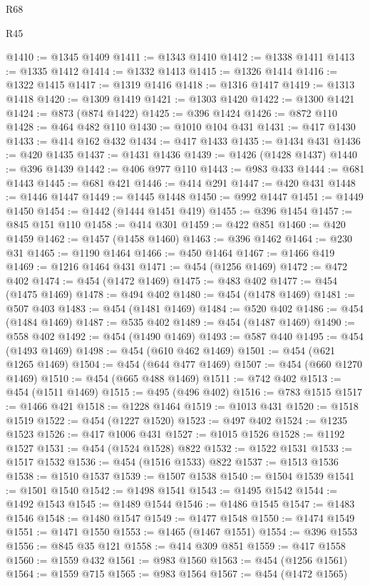 \begin{lexlean}{R68}
\begin{lexlean}{R45}
\begin{coremodule}
{{{{{{{{{{{{{{{{{{{{{{{{{{{{{{{{{{{{{{{{{{{{{{{{{{{{{{{{{{{{{{{{{{{{{{{{{{{{{{{{{{{{{{{{{{{@1410 := @1345 @1409
@1411 := @1343 @1410
@1412 := @1338 @1411
@1413 := @1335 @1412
@1414 := @1332 @1413
@1415 := @1326 @1414
@1416 := @1322 @1415
@1417 := @1319 @1416
@1418 := @1316 @1417
@1419 := @1313 @1418
@1420 := @1309 @1419
@1421 := @1303 @1420
@1422 := @1300 @1421
@1424 := @873 (@874 @1422)
@1425 := @396 @1424
@1426 := @872 @110
@1428 := @464 @482 @110
@1430 := @1010 @104 @431
@1431 := @417 @1430
@1433 := @414 @162 @432
@1434 := @417 @1433
@1435 := @1434 @431
@1436 := @420 @1435
@1437 := @1431 @1436
@1439 := @1426 (@1428 @1437)
@1440 := @396 @1439
@1442 := @406 @977 @110
@1443 := @983 @433
@1444 := @681 @1443
@1445 := @681 @421
@1446 := @414 @291
@1447 := @420 @431
@1448 := @1446 @1447
@1449 := @1445 @1448
@1450 := @992 @1447
@1451 := @1449 @1450
@1454 := @1442 (@1444 @1451 @419)
@1455 := @396 @1454
@1457 := @845 @151 @110
@1458 := @414 @301
@1459 := @422 @851
@1460 := @420 @1459
@1462 := @1457 (@1458 @1460)
@1463 := @396 @1462
@1464 := @230 @31
@1465 := @1190 @1464
@1466 := @450 @1464
@1467 := @1466 @419
@1469 := @1216 @1464 @431
@1471 := @454 (@1256 @1469)
@1472 := @472 @402
@1474 := @454 (@1472 @1469)
@1475 := @483 @402
@1477 := @454 (@1475 @1469)
@1478 := @494 @402
@1480 := @454 (@1478 @1469)
@1481 := @507 @403
@1483 := @454 (@1481 @1469)
@1484 := @520 @402
@1486 := @454 (@1484 @1469)
@1487 := @535 @402
@1489 := @454 (@1487 @1469)
@1490 := @558 @402
@1492 := @454 (@1490 @1469)
@1493 := @587 @440
@1495 := @454 (@1493 @1469)
@1498 := @454 (@610 @462 @1469)
@1501 := @454 (@621 @1265 @1469)
@1504 := @454 (@644 @477 @1469)
@1507 := @454 (@660 @1270 @1469)
@1510 := @454 (@665 @488 @1469)
@1511 := @742 @402
@1513 := @454 (@1511 @1469)
@1515 := @495 (@496 @402)
@1516 := @783 @1515
@1517 := @1466 @421
@1518 := @1228 @1464
@1519 := @1013 @431
@1520 := @1518 @1519
@1522 := @454 (@1227 @1520)
@1523 := @497 @402
@1524 := @1235 @1523
@1526 := @417 @1006 @431
@1527 := @1015 @1526
@1528 := @1192 @1527
@1531 := @454 (@1524 @1528) @822
@1532 := @1522 @1531
@1533 := @1517 @1532
@1536 := @454 (@1516 @1533) @822
@1537 := @1513 @1536
@1538 := @1510 @1537
@1539 := @1507 @1538
@1540 := @1504 @1539
@1541 := @1501 @1540
@1542 := @1498 @1541
@1543 := @1495 @1542
@1544 := @1492 @1543
@1545 := @1489 @1544
@1546 := @1486 @1545
@1547 := @1483 @1546
@1548 := @1480 @1547
@1549 := @1477 @1548
@1550 := @1474 @1549
@1551 := @1471 @1550
@1553 := @1465 (@1467 @1551)
@1554 := @396 @1553
@1556 := @845 @35 @121
@1558 := @414 @309 @851
@1559 := @417 @1558
@1560 := @1559 @432
@1561 := @983 @1560
@1563 := @454 (@1256 @1561)
@1564 := @1559 @715
@1565 := @983 @1564
@1567 := @454 (@1472 @1565)
}}}}}}}}}}}}}}}}}}}}}}}}}}}}}}}}}}}}}}}}}}}}}}}}}}}}}}}}}}}}}}}}}}}}}}}}}}}}}}}}}}}}}}}}}}}
\end{coremodule}
\end{lexlean}
\end{lexlean}
